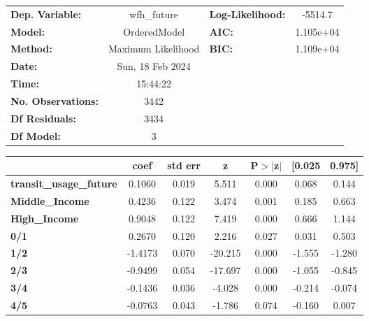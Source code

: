 \documentclass{report}
\begin{document}
\begin{center}
\begin{tabular}{lclc}
\toprule
\textbf{Dep. Variable:}         &    wfh\_future     & \textbf{  Log-Likelihood:    } &   -5514.7   \\
\textbf{Model:}                 &    OrderedModel    & \textbf{  AIC:               } & 1.105e+04   \\
\textbf{Method:}                & Maximum Likelihood & \textbf{  BIC:               } & 1.109e+04   \\
\textbf{Date:}                  &  Sun, 18 Feb 2024  & \textbf{                     } &             \\
\textbf{Time:}                  &      15:44:22      & \textbf{                     } &             \\
\textbf{No. Observations:}      &         3442       & \textbf{                     } &             \\
\textbf{Df Residuals:}          &         3434       & \textbf{                     } &             \\
\textbf{Df Model:}              &            3       & \textbf{                     } &             \\
\bottomrule
\end{tabular}
\begin{tabular}{lcccccc}
                                & \textbf{coef} & \textbf{std err} & \textbf{z} & \textbf{P$> |$z$|$} & \textbf{[0.025} & \textbf{0.975]}  \\
\midrule
\textbf{transit\_usage\_future} &       0.1060  &        0.019     &     5.511  &         0.000        &        0.068    &        0.144     \\
\textbf{Middle\_Income}         &       0.4236  &        0.122     &     3.474  &         0.001        &        0.185    &        0.663     \\
\textbf{High\_Income}           &       0.9048  &        0.122     &     7.419  &         0.000        &        0.666    &        1.144     \\
\textbf{0/1}                    &       0.2670  &        0.120     &     2.216  &         0.027        &        0.031    &        0.503     \\
\textbf{1/2}                    &      -1.4173  &        0.070     &   -20.215  &         0.000        &       -1.555    &       -1.280     \\
\textbf{2/3}                    &      -0.9499  &        0.054     &   -17.697  &         0.000        &       -1.055    &       -0.845     \\
\textbf{3/4}                    &      -0.1436  &        0.036     &    -4.028  &         0.000        &       -0.214    &       -0.074     \\
\textbf{4/5}                    &      -0.0763  &        0.043     &    -1.786  &         0.074        &       -0.160    &        0.007     \\
\bottomrule
\end{tabular}
\end{center}
\end{document}

